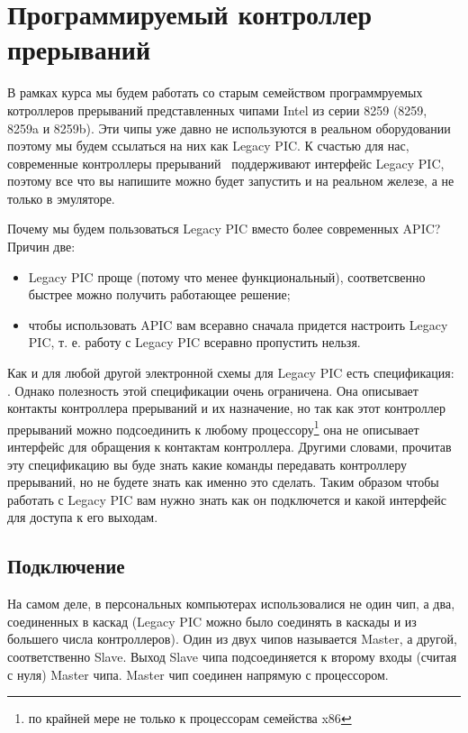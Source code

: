\section{Программируемый контроллер прерываний}

В рамках курса мы будем работать со старым семейством программруемых котроллеров
прерываний представленных чипами Intel из серии 8259 (8259, 8259a и 8259b). Эти
чипы уже давно не используются в реальном оборудовании поэтому мы будем
ссылаться на них как Legacy PIC. К счастью для нас, современные контроллеры
прерываний~\cite{WIKI:APIC} поддерживают интерфейс Legacy PIC, поэтому все что
вы напишите можно будет запустить и на реальном железе, а не только в эмуляторе.

Почему мы будем пользоваться Legacy PIC вместо более современных APIC? Причин
две:
\begin{itemize}
  \item Legacy PIC проще (потому что менее функциональный), соответсвенно
        быстрее можно получить работающее решение;
  \item чтобы использовать APIC вам всеравно сначала придется настроить
        Legacy PIC, т. е. работу с Legacy PIC всеравно пропустить нельзя.
\end{itemize}

Как и для любой другой электронной схемы для Legacy PIC есть спецификация: \cite{INTEL:8259ADS}. Однако полезность этой спецификации очень ограничена. Она
описывает контакты контроллера прерываний и их назначение, но так как этот
контроллер прерываний можно подсоединить к любому процессору\footnote{по крайней
мере не только к процессорам семейства x86} она не описывает интерфейс для
обращения к контактам контроллера. Другими словами, прочитав эту спецификацию
вы буде знать какие команды передавать контроллеру прерываний, но не будете
знать как именно это сделать. Таким образом чтобы работать с Legacy PIC вам
нужно знать как он подключется и какой интерфейс для доступа к его выходам.

\subsection{Подключение}

На самом деле, в персональных компьютерах использовалися не один чип, а два,
соединенных в каскад (Legacy PIC можно было соединять в каскады и из большего
числа контроллеров). Один из двух чипов называется Master, а другой,
соответственно Slave. Выход Slave чипа подсоединяется к второму входы (считая с
нуля) Master чипа. Master чип соединен напрямую с процессором.

